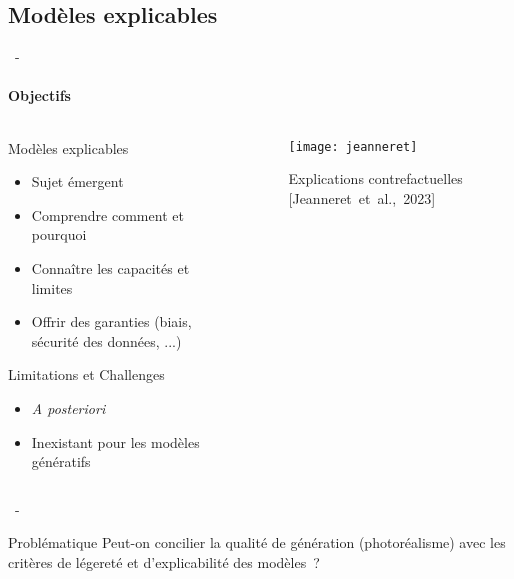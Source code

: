 \documentclass[aspectratio=169, 22pt]{beamer}
\begin{document}
\subsection{Modèles explicables}
\begin{frame}{\secname~- \subsecname}
  \framesubtitle{Objectifs}
  \begin{columns}
    \begin{column}{0.5\linewidth}
      \begin{block}{Modèles explicables}        
        \begin{itemize}
        \item \small Sujet émergent
        \item \small Comprendre comment et pourquoi 
        \item \small Connaître les capacités et limites
        \item \small Offrir des garanties (biais, sécurité des données, ...)
        \end{itemize}
      \end{block}
      \begin{alertblock}{Limitations et Challenges}
        \begin{itemize}
        \item \small \emph{A posteriori}
        \item \small Inexistant pour les modèles génératifs
        \end{itemize}
      \end{alertblock}
    \end{column}
    \begin{column}{0.5\linewidth}
      \begin{figure}
        \centering
        \texttt{[image: jeanneret]}
        \caption{{Explications contrefactuelles [Jeanneret et al., 2023]}}
      \end{figure}
    \end{column}
  \end{columns}    
\end{frame}

\begin{frame}{\secname~- \subsecname}
  \begin{customblock}{\centering Problématique}
    \centering
    Peut-on concilier la qualité de génération (photoréalisme) avec
    les critères de légereté et d'explicabilité des modèles ?
  \end{customblock}
\end{frame}
\end{document}
